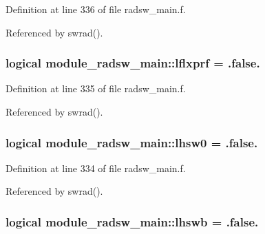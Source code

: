 Definition at line 336 of file radsw\+\_\+main.\+f.



Referenced by swrad().

\subsubsection[{\texorpdfstring{lflxprf}{lflxprf}}]{\setlength{\rightskip}{0pt plus 5cm}logical module\+\_\+radsw\+\_\+main\+::lflxprf = .false.\hspace{0.3cm}{\ttfamily [private]}}\hypertarget{namespacemodule__radsw__main_ac4ab674edb40fda0c89aa8ee331ccdc6}{}\label{namespacemodule__radsw__main_ac4ab674edb40fda0c89aa8ee331ccdc6}


Definition at line 335 of file radsw\+\_\+main.\+f.



Referenced by swrad().

\subsubsection[{\texorpdfstring{lhsw0}{lhsw0}}]{\setlength{\rightskip}{0pt plus 5cm}logical module\+\_\+radsw\+\_\+main\+::lhsw0 = .false.\hspace{0.3cm}{\ttfamily [private]}}\hypertarget{namespacemodule__radsw__main_a3fd8cae0d38772eea36ce6ec2d258997}{}\label{namespacemodule__radsw__main_a3fd8cae0d38772eea36ce6ec2d258997}


Definition at line 334 of file radsw\+\_\+main.\+f.



Referenced by swrad().

\subsubsection[{\texorpdfstring{lhswb}{lhswb}}]{\setlength{\rightskip}{0pt plus 5cm}logical module\+\_\+radsw\+\_\+main\+::lhswb = .false.\hspace{0.3cm}{\ttfamily [private]}}\hypertarget{namespacemodule__radsw__main_a08bfecbd5edb2ad3ba0ae836cfe18d05}{}\label{namespacemodule__radsw__main_a08bfecbd5edb2ad3ba0ae836cfe18d05}


